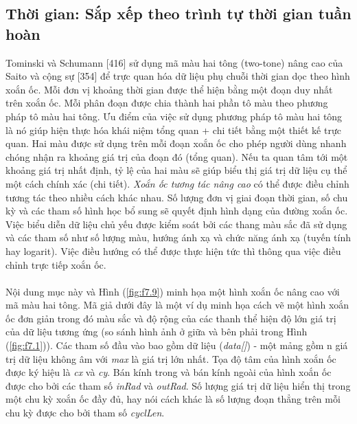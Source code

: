 \subsection{Thời gian: Sắp xếp theo trình tự thời gian tuần hoàn}
Tominski và Schumann [416] sử dụng mã màu hai tông (two-tone) nâng cao của Saito và cộng sự [354] để trực quan hóa dữ liệu phụ chuỗi thời gian dọc theo hình xoắn ốc. Mỗi đơn vị khoảng thời gian được thể hiện bằng một đoạn duy nhất trên xoắn ốc. Mỗi phân đoạn được chia thành hai phần tô màu theo phương pháp tô màu hai tông. Ưu điểm của việc sử dụng phương pháp tô màu hai tông là nó giúp hiện thực hóa khái niệm tổng quan + chi tiết bằng một thiết kế trực quan. Hai màu được sử dụng trên mỗi đoạn xoắn ốc cho phép người dùng nhanh chóng nhận ra khoảng giá trị của đoạn đó (tổng quan). Nếu ta quan tâm tới một khoảng giá trị nhất định, tỷ lệ của hai màu sẽ giúp biểu thị giá trị dữ liệu cụ thể một cách chính xác (chi tiết). \textit{Xoắn ốc tương tác nâng cao} có thể được điều chỉnh tương tác theo nhiều cách khác nhau. Số lượng đơn vị giai đoạn thời gian, số chu kỳ và các tham số hình học bổ sung sẽ quyết định hình dạng của đường xoắn ốc. Việc biểu diễn dữ liệu chủ yếu được kiểm soát bởi các thang màu sắc đã sử dụng và các tham số như số lượng màu, hướng ánh xạ và chức năng ánh xạ (tuyến tính hay logarit). Việc điều hướng có thể được thực hiện tức thì thông qua việc điều chỉnh trực tiếp xoắn ốc.
\\ \\ 
Nội dung mục này và Hình (\ref{fig:f7.9}) minh họa một hình xoắn ốc nâng cao với mã màu hai tông. Mã giả dưới đây là một ví dụ minh họa cách vẽ một hình xoắn ốc đơn giản trong đó màu sắc và độ rộng của các thanh thể hiện độ lớn giá trị của dữ liệu tương ứng (so sánh hình ảnh ở giữa và bên phải trong Hình (\ref{fig:f7.1})). Các tham số đầu vào bao gồm dữ liệu (\textit{data[]}) - một mảng gồm n giá trị dữ liệu không âm với \textit{max} là giá trị lớn nhất. Tọa độ tâm của hình xoắn ốc được ký hiệu là \textit{cx} và \textit{cy}. Bán kính trong và bán kính ngoài của hình xoắn ốc được cho bởi các tham số \textit{inRad} và \textit{outRad}. Số lượng giá trị dữ liệu hiển thị trong một chu kỳ xoắn ốc đầy đủ, hay nói cách khác là số lượng đoạn thẳng trên mỗi chu kỳ được cho bởi tham số \textit{cyclLen}.
